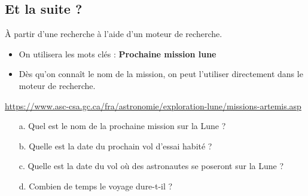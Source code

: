 \subsection*{Et la suite ?}

À partir d'une recherche à l'aide d'un moteur de recherche. 

\begin{itemize}
  \item On utilisera les mots clés : \textbf{Prochaine mission lune}
  \item Dès qu'on connaît le nom de la mission, on peut l'utiliser directement dans le moteur de recherche.
\end{itemize}
\url{https://www.asc-csa.gc.ca/fra/astronomie/exploration-lune/missions-artemis.asp}

\begin{enumerate}
  \item[a.] Quel est le nom de la prochaine mission sur la Lune ? \dotfill
  \item[b.] Quelle est la date du prochain vol d'essai habité ? \dotfill
  \item[c.] Quelle est la date du vol où des astronautes se poseront sur la Lune ?  \dotfill
  \item[d.] Combien de temps le voyage dure-t-il ? \dotfill
\end{enumerate}

